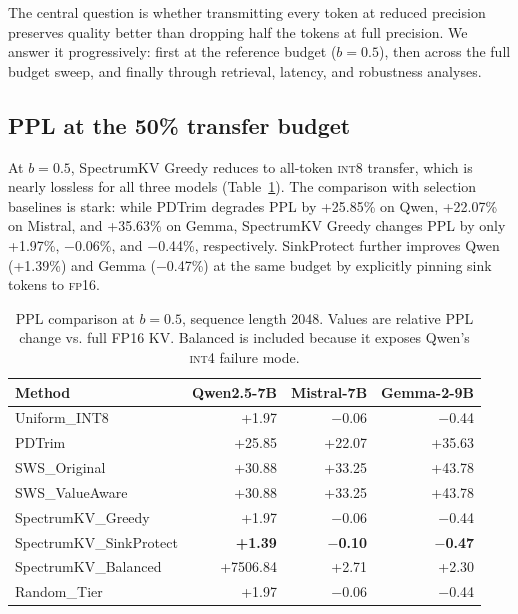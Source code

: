 \documentclass[11pt]{article}
\newcommand{\method}{SpectrumKV}
\newcommand{\budget}{b}
\newcommand{\pct}{\%}
\newcommand{\fp}{\textsc{fp16}}
\newcommand{\intviii}{\textsc{int8}}
\newcommand{\intiv}{\textsc{int4}}
\theoremstyle{plain}
\theoremstyle{definition}
\begin{document}
The central question is whether transmitting every token at reduced precision preserves quality better than dropping half the tokens at full precision.  We answer it progressively: first at the reference budget ($\budget=0.5$), then across the full budget sweep, and finally through retrieval, latency, and robustness analyses.

\subsection{PPL at the 50\pct{} transfer budget}
\label{sec:rq7}

At $\budget=0.5$, \method{} Greedy reduces to all-token \intviii{} transfer, which is nearly lossless for all three models (Table~\ref{tab:ppl50}).  The comparison with selection baselines is stark: while PDTrim degrades PPL by +25.85\pct{} on Qwen, +22.07\pct{} on Mistral, and +35.63\pct{} on Gemma, \method{} Greedy changes PPL by only +1.97\pct{}, $-$0.06\pct{}, and $-$0.44\pct{}, respectively.  SinkProtect further improves Qwen (+1.39\pct{}) and Gemma ($-$0.47\pct{}) at the same budget by explicitly pinning sink tokens to \fp{}.

\begin{table}[t]
\centering
\caption{PPL comparison at $\budget=0.5$, sequence length 2048.  Values are relative PPL change vs. full FP16 KV.  Balanced is included because it exposes Qwen's \intiv{} failure mode.}
\label{tab:ppl50}
\small
\begin{tabular}{lrrr}
\toprule
Method & Qwen2.5-7B & Mistral-7B & Gemma-2-9B \\
\midrule
Uniform\_INT8 & +1.97 & $-$0.06 & $-$0.44 \\
PDTrim & +25.85 & +22.07 & +35.63 \\
SWS\_Original & +30.88 & +33.25 & +43.78 \\
SWS\_ValueAware & +30.88 & +33.25 & +43.78 \\
\method{}\_Greedy & +1.97 & $-$0.06 & $-$0.44 \\
\method{}\_SinkProtect & \textbf{+1.39} & \textbf{$-$0.10} & \textbf{$-$0.47} \\
\method{}\_Balanced & +7506.84 & +2.71 & +2.30 \\
Random\_Tier & +1.97 & $-$0.06 & $-$0.44 \\
\bottomrule
\end{tabular}
\end{table}
\end{document}
